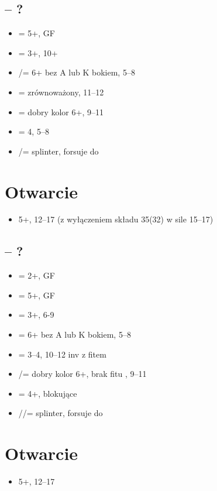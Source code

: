 \documentclass[12pt]{article}
\begin{document}
\subsection{\texorpdfstring{\Ds[1] – ?}{1D – ?}}
\begin{itemize}
    \item \Cs[2] = 5+\Cs, GF
    \item \Ds[2] = 3+\Ds, 10+
    \item \Hs[2]/\Ss[] = 6+ bez A lub K bokiem, 5–8
    \item \NT[2] = zrównoważony, 11–12
    \item \Cs[3] = dobry kolor 6+, 9–11
    \item \Ds[3] = 4\Ds, 5–8
    \item \Hs[3]/\Ss[] = splinter, forsuje do \Ds[4]
\end{itemize}

\newpage
\section{Otwarcie \texorpdfstring{\Hs[1]}{1H}}
\begin{itemize}
    \item 5+\Hs, 12–17 (z wyłączeniem składu 35(32) w sile 15–17)
\end{itemize}
\subsection{\texorpdfstring{\Hs[1] – ?}{1H – ?}}
\begin{itemize}
    \item \Cs[2] = 2+\Cs, GF
    \item \Ds[2] = 5+\Ds, GF
    \item \Hs[2] = 3+\Hs, 6-9 
    \item \Ss[2] = 6+ bez A lub K bokiem, 5–8
    \item \NT[2] = 3–4\Hs, 10–12 inv z fitem
    \item \Cs[3]/\Ds[] = dobry kolor 6+, brak fitu \Hs, 9–11
    \item \Hs[3] = 4+\Hs, blokujące
    \item \Ss[3]/\Cs[4]/\Ds[4] = splinter, forsuje do \Hs[4]
\end{itemize}

\newpage
\section{Otwarcie \texorpdfstring{\Ss[1]}{1S}}
\begin{itemize}
    \item 5+\Ss, 12–17
\end{itemize}
\end{document}
